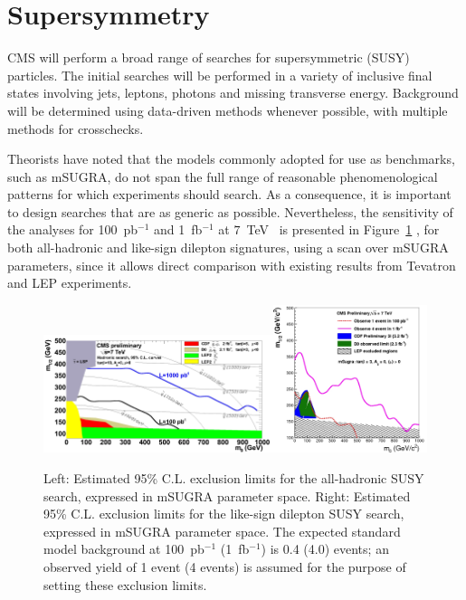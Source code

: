 \documentclass{PoS}
\begin{document}
\section{Supersymmetry}
CMS will perform a broad range of searches for supersymmetric (SUSY) particles. The initial searches
will be performed in a variety of inclusive final states involving jets, leptons, photons and missing 
transverse energy. Background will be determined using data-driven  methods whenever possible, with multiple 
methods for crosschecks. 

Theorists have noted that the models commonly adopted for use as benchmarks, such as mSUGRA, 
do not span the full range of reasonable phenomenological patterns for which experiments should search.
As a consequence, it is important to design searches that are as generic as possible.
Nevertheless, the sensitivity of the analyses for 100~pb$^{-1}$ and 1~fb$^{-1}$ 
at $7$~TeV~\cite{CMSPhysicsReach7TeV} is presented in Figure~\ref{fig:SUSY} 
, for both all-hadronic and like-sign dilepton signatures, using a scan over mSUGRA parameters,  
since it allows direct comparison with existing results from Tevatron and LEP experiments.

\begin{figure}[htbp] 
\centering
\includegraphics[width=0.6\textwidth]{SUSY_Fig1.jpg}\includegraphics[width=0.4\textwidth]{SUSY_Fig2.jpg}  
\caption{Left: Estimated 95\% C.L. exclusion limits for the all-hadronic SUSY search, expressed in mSUGRA 
parameter space. Right: Estimated 95\% C.L. exclusion limits for the like-sign dilepton SUSY search, 
expressed in mSUGRA parameter space. The expected standard model background at 100~pb$^{-1}$ (1~fb$^{-1}$) 
is 0.4 (4.0) events; an observed yield of 1 event (4 events) is assumed for the purpose of setting these exclusion limits.}
\label{fig:SUSY}
\end{figure}
\end{document}
